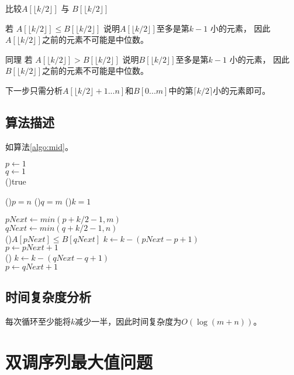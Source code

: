 比较$A[\lfloor k/2 \rfloor]$ 与 $B[\lfloor k/2 \rfloor]$ 

若 $A[\lfloor k/2 \rfloor] \leq B[\lfloor k/2 \rfloor]$ 说明$A[\lfloor k/2 \rfloor]$至多是第$k-1$ 小的元素， 因此$A[\lfloor k/2 \rfloor]$之前的元素不可能是中位数。

同理 若  $A[\lfloor k/2 \rfloor] > B[\lfloor k/2 \rfloor]$ 说明$B[\lfloor k/2 \rfloor]$至多是第$k-1$ 小的元素， 因此$B[\lfloor k/2 \rfloor]$之前的元素不可能是中位数。

下一步只需分析$A[\lfloor k/2 \rfloor + 1...n]$和$B[0...m]$中的第$\lceil k/2 \rceil$小的元素即可。 

\subsection*{算法描述}
如算法\ref{algo:mid}。

\begin{algorithm}[H]
    \caption{$findKthMinElement(A[1..n], B[1..m],k)$}\label{algo:mid}
     $p \leftarrow 1$\\
     $q \leftarrow 1$\\
    \While(){true}{
        \If(){$p = n$}{
        }
        \If(){$q = m$}{
        }
        \If(){$k=1$}{
        }

        $pNext\leftarrow min(p+k/2-1,m)$\\
        $qNext\leftarrow min(q+k/2-1,n)$\\

        \If(){$A[pNext] \leq B[qNext]$}{
            $k \leftarrow k-(pNext - p + 1)$\\
            $p\leftarrow pNext + 1$\\
        }\Else(){
            $k \leftarrow k-(qNext - q + 1)$\\
            $p \leftarrow qNext + 1$\\
        }
    }
    
\end{algorithm}

\subsection*{时间复杂度分析}
每次循环至少能将$k$减少一半，因此时间复杂度为$O(\log (m+n))$。

\section{双调序列最大值问题}
